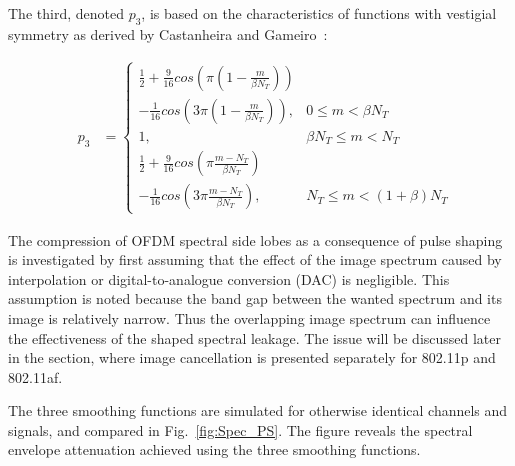 The third, denoted $p_3$, is based on the characteristics of functions with vestigial symmetry as derived by Castanheira and Gameiro~\cite{Castanheira2013}:

\begin{eqnarray}
\label{p3m}
&p_3 &=\begin{cases}	\frac{1}{2}+\frac{9}{16}cos( \pi(1 - \frac{m}{\beta N_{T}}) ) & \\
						- \frac{1}{16}cos(3\pi(1 - \frac{m}{\beta N_{T}}) ), 					& 0 \leq m < \beta N_{T} \\
					 	1, 																	& \beta N_{T} \leq m < N_{T}  \\
					 	\frac{1}{2}+\frac{9}{16}cos( \pi \frac{m-N_{T}}{\beta N_{T}}) &\\
						-\frac{1}{16}cos(3\pi \frac{m-N_{T}}{\beta N_{T}}),					&  N_{T} \leq m < (1+\beta)N_{T} \end{cases}
\end{eqnarray}


The compression of OFDM spectral side lobes as a consequence of pulse shaping is investigated by first assuming that the effect of the image spectrum caused by interpolation or digital-to-analogue conversion (DAC) is negligible.
This assumption is noted because the band gap between the wanted spectrum and its image is relatively narrow.
Thus the overlapping image spectrum can influence the effectiveness of the shaped spectral leakage.
The issue will be discussed later in the section, where image cancellation is presented separately for 802.11p and 802.11af.

The three smoothing functions are simulated for otherwise identical channels and signals, and compared in Fig.~\ref{fig:Spec_PS}. The figure reveals the spectral envelope attenuation achieved using the three smoothing functions.

